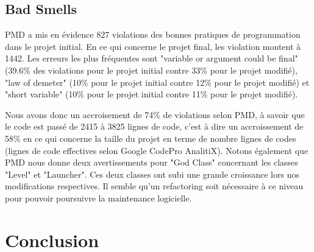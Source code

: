 \documentclass[a4paper,12pt]{report} %
\begin{document}
\subsection{Bad Smells}
PMD a mis en évidence 827 violations des bonnes pratiques de programmation
dans le projet initial. En ce qui concerne le projet final, les violation montent à 1442. Les erreurs les plus fréquentes sont "variable
or argument could be final" (39.6\% des violations pour le projet
initial contre 33\% pour le projet modifié), "law of demeter"
(10\% pour le projet initial contre 12\% pour le projet modifié) et
"short variable" (10\% pour le projet initial contre 11\% pour
le projet modifié).

Nous avons donc un accroisement de 74\% de violations selon PMD, à savoir
que le code est passé de 2415 à 3825 lignes de code, c'est à dire
un accroissement de 58\% en ce qui concerne la taille du projet en terme de nombre
lignes de codes (lignes de code effectives selon Google CodePro AnalitiX).
Notons également que PMD nous donne deux avertissements pour "God Class"
concernant les classes "Level" et "Launcher". Ces deux classes ont subi une grande croissance lors nos
modifications respectives. Il semble qu'un refactoring soit nécessaire
à ce niveau pour pouvoir poursuivre la maintenance logicielle.

\section{Conclusion}
\end{document}

